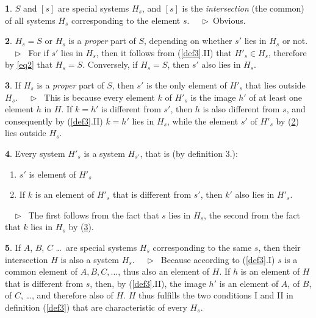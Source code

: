\documentclass[leqno,hidelinks,a4paper]{article}
\theoremstyle{definition}
\newtheorem{satz}{\protect\satzname}
\newcommand{\satzname}{}
\renewcommand{\satzname}{\hspace{-4pt}.\ Satz}%
\renewcommand{\satzname}{\hspace{-4pt}.\ Theorem}%
\newcommand\Beweis{\medskip \newline $ \phantom{'.'} \rhd \ $}%
\newcommand\beweis{ $ \phantom{'.'} \rhd \ $}%
\newcommand{\partof}{\in}
\begin{document}
\begin{paracol}{2}
\begin{satz}\label{thm4}
$S$ and $[s]$ are special systems $H_s$, and $[s]$ is the \emph{intersection}
(the common) of all systems $H_s$ corresponding to the element $s$.
\Beweis Obvious. \end{satz}

\begin{satz}\label{thm5}
$H_s = S$ or $H_s$ is a \textit{proper} part of $S$, depending on whether  $s'$
lies in $H_s$ or not.
\Beweis
For if $s'$ lies in $H_s$, then it follows from (\ref{def3}.II) that
$H'_s \partof H_s$, therefore by \eqref{eq2} that $H_s = S$. Conversely, if
$H_s = S$, then $s'$ also lies in $H_s$.
\end{satz}

\begin{satz}\label{thm6}
If $H_s$ is a \emph{proper} part of $S$, then $s'$ is the only element of $H'_s$
that lies outside $H_s$.
\Beweis
This is because every element $k$ of $H'_s$ is the image $h'$ of at least one
element $h$ in $H$. If $k=h'$ is different from $s'$, then $h$ is also different
from $s$, and consequently by (\ref{def3}.II) $k = h'$ lies in $H_s$, while the
element $s'$ of $H'_s$ by (\ref{thm5}) lies outside $H_s$.
\end{satz}

\begin{satz}\label{thm7}
Every system $H'_s$ is a system $H_{s'}$, that is (by definition 3.):
\begin{enumerate}[I'.]
	\item $s'$ is element of $H'_s$
	\item If $k$ is an element of $H'_s$ that is different from $s'$, then $k'$
    also lies in $H'_s$.
\end{enumerate}
\beweis
The first follows from the fact that $s$ lies in $H_s$, the second from the fact
that $k$ lies in $H_s$ by (\ref{thm6}).
\end{satz}

\begin{satz}\label{thm8}
If $A$, $B$, $C$ \ldots\ are special systems $H_s$ corresponding to the same $s$,
then their intersection $H$ is also a system $H_s$.
\Beweis
Because according to (\ref{def3}.I) $s$ is a common element of $A, B, C, \ldots$,
thus also an element of $H$. If $h$ is an element of $H$ that is different from
$s$, then, by  (\ref{def3}.II), the image $h'$ is an element of $A$, of $B$, of
$C$, \ldots, and therefore also of $H$. $H$ thus fulfills the two conditions I
and II in definition (\ref{def3}) that are characteristic of every $H_s$.
\end{satz}


\end{paracol}
\end{document}
